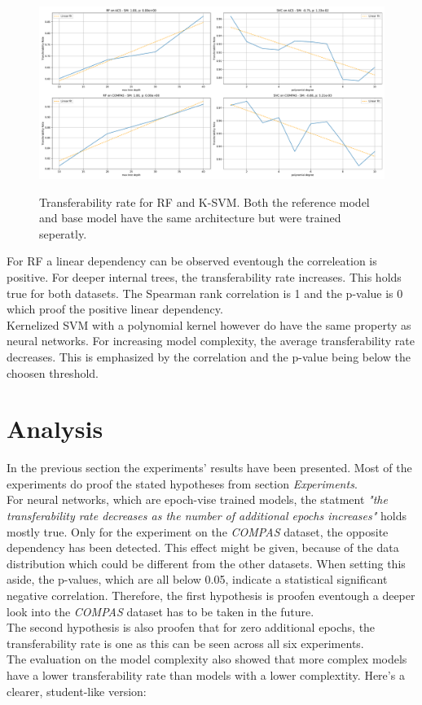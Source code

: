 \documentclass{article}
\begin{document}
\begin{figure}[h]
    \centering
    \includegraphics[width=\linewidth]{abb/architecture_evaluation_other_models.pdf}
    \label{fig:arch_eval_other}
    \caption{Transferability rate for RF and K-SVM. Both the reference model and base model have the same architecture but were trained seperatly.}
\end{figure}
\noindent
For RF a linear dependency can be observed eventough the correleation is positive. For deeper internal trees, the transferability rate increases. This holds true for both datasets. The Spearman rank correlation is 1 and the p-value is 0 which proof the positive linear dependency. \\
Kernelized SVM with a polynomial kernel however do have the same property as neural networks. For increasing model complexity, the average transferability rate decreases. This is emphasized by the correlation and the p-value being below the choosen threshold.

\section{Analysis}
In the previous section the experiments' results have been presented. Most of the experiments do proof the stated hypotheses from section \textit{Experiments}. \\
For neural networks, which are epoch-vise trained models, the statment \textit{"the transferability rate decreases as the number of additional epochs increases"} holds mostly true. Only for the experiment on the \textit{COMPAS} dataset, the opposite dependency has been detected. This effect might be given, because of the data distribution which could be different from the other datasets. When setting this aside, the p-values, which are all below 0.05, indicate a statistical significant negative correlation. Therefore, the first hypothesis is proofen eventough a deeper look into the \textit{COMPAS} dataset has to be taken in the future. \\
The second hypothesis is also proofen that for zero additional epochs, the transferability rate is one as this can be seen across all six experiments.\\
The evaluation on the model complexity also showed that more complex models have a lower transferability rate than models with a lower complextity. Here's a clearer, student-like version:
\end{document}
